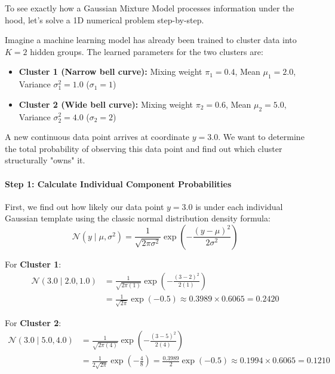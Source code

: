 \documentclass{article}
\begin{document}
To see exactly how a Gaussian Mixture Model processes information under the hood, let's solve a 1D numerical problem step-by-step.

Imagine a machine learning model has already been trained to cluster data into $K=2$ hidden groups. The learned parameters for the two clusters are:
\begin{itemize}
    \item \textbf{Cluster 1 (Narrow bell curve):} Mixing weight $\pi_1 = 0.4$, Mean $\mu_1 = 2.0$, Variance $\sigma_1^2 = 1.0$ ($\sigma_1 = 1$)
    \item \textbf{Cluster 2 (Wide bell curve):} Mixing weight $\pi_2 = 0.6$, Mean $\mu_2 = 5.0$, Variance $\sigma_2^2 = 4.0$ ($\sigma_2 = 2$)
\end{itemize}

A new continuous data point arrives at coordinate \textbf{$y = 3.0$}. We want to determine the total probability of observing this data point and find out which cluster structurally "owns" it.

\paragraph{Step 1: Calculate Individual Component Probabilities}
First, we find out how likely our data point $y=3.0$ is under each individual Gaussian template using the classic normal distribution density formula:
\begin{equation*}
\mathcal{N}(y \mid \mu, \sigma^2) = \frac{1}{\sqrt{2\pi\sigma^2}} \exp\left( -\frac{(y - \mu)^2}{2\sigma^2} \right)
\end{equation*}

For \textbf{Cluster 1}:
\begin{align}
\mathcal{N}(3.0 \mid 2.0, 1.0) &= \frac{1}{\sqrt{2\pi(1)}} \exp\left( -\frac{(3 - 2)^2}{2(1)} \right) \nonumber \\
&= \frac{1}{\sqrt{2\pi}} \exp(-0.5) \approx 0.3989 \times 0.6065 = \mathbf{0.2420} \tag{121}
\end{align}

For \textbf{Cluster 2}:
\begin{align}
\mathcal{N}(3.0 \mid 5.0, 4.0) &= \frac{1}{\sqrt{2\pi(4)}} \exp\left( -\frac{(3 - 5)^2}{2(4)} \right) \nonumber \\
&= \frac{1}{2\sqrt{2\pi}} \exp\left(-\frac{4}{8}\right) = \frac{0.3989}{2} \exp(-0.5) \approx 0.1994 \times 0.6065 = \mathbf{0.1210} \tag{122}
\end{align}
\end{document}
